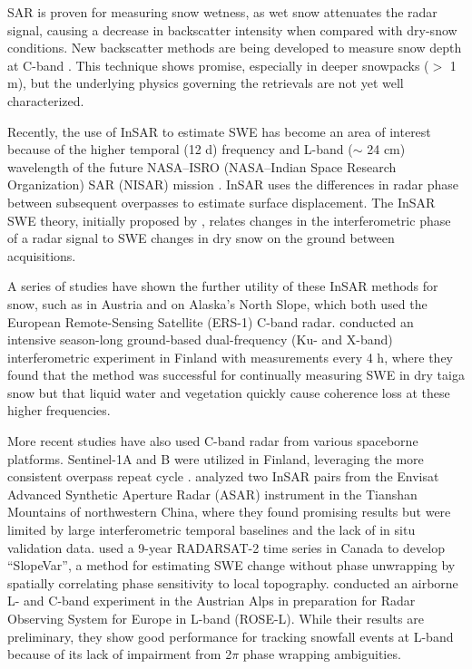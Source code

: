 SAR is proven for measuring snow wetness, \citep{naglerRetrievalWetSnow2000,naglerAdvancementsSnowmeltMonitoring2016,lundMappingSnowmeltProgression2020} as wet snow attenuates the radar signal, causing a decrease in backscatter intensity when compared with dry-snow conditions. New backscatter methods are being developed to measure snow depth at C-band \citep{lievensSnowDepthVariability2019,lievensSentinel1SnowDepth2022}. This technique shows promise, especially in deeper snowpacks ($>$ 1 m), but the underlying physics governing the retrievals are not yet well characterized.

Recently, the use of InSAR to estimate SWE has become an area of interest because of the higher temporal (12 d) frequency and L-band ($\sim$ 24 cm) wavelength of the future NASA--ISRO (NASA--Indian Space Research Organization) SAR (NISAR) mission \citep{rosenNASAISROSARNISAR2017}. InSAR uses the differences in radar phase between subsequent overpasses to estimate surface displacement. The InSAR SWE theory, initially proposed by \citet{guneriussenInSAREstimationChanges2001}, relates changes in the interferometric phase of a radar signal to SWE changes in dry snow on the ground between acquisitions.

A series of studies have shown the further utility of these InSAR methods for snow, such as \citet{rottSnowMassRetrieval2003} in Austria and \citet{deebMonitoringSnowpackEvolution2011} on Alaska's North Slope, which both used the European Remote-Sensing Satellite (ERS-1) C-band radar. \citet{leinssSnowWaterEquivalent2015} conducted an intensive season-long ground-based dual-frequency (Ku- and X-band) interferometric experiment in Finland with measurements every 4 h, where they found that the method was successful for continually measuring SWE in dry taiga snow but that liquid water and vegetation quickly cause coherence loss at these higher frequencies.

More recent studies have also used C-band radar from various spaceborne platforms. Sentinel-1A and B were utilized in Finland, leveraging the more consistent overpass repeat cycle \citep{condeEstimationTemporalChanges2019}. \citet{liEstimatingSnowDepth2017} analyzed two InSAR pairs from the Envisat  Advanced Synthetic Aperture Radar (ASAR) instrument in the Tianshan Mountains of northwestern China, where they found promising results but were limited by large interferometric temporal baselines and the lack of in situ validation data. \citet{epplerSnowWaterEquivalent2022} used a 9-year RADARSAT-2 time series in Canada to develop ``SlopeVar'', a method for estimating SWE change without phase unwrapping by spatially correlating phase sensitivity to local topography. \citet{naglerAirborneExperimentInsar2022} conducted an airborne L- and C-band experiment in the Austrian Alps in preparation for Radar Observing System for Europe in L-band (ROSE-L). While their results are preliminary, they show good performance for tracking snowfall events at L-band because of its lack of impairment from 2$\pi$ phase wrapping ambiguities.

